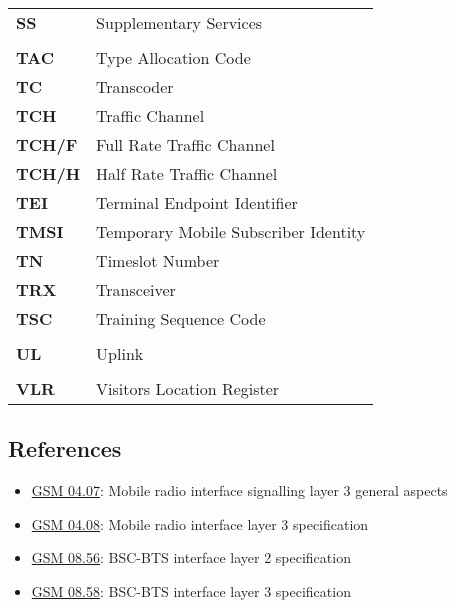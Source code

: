 \documentclass[documentation]{subfiles}
\begin{document}
\begin{longtable}{>{\bf}ll}
    SS      & Supplementary Services\\
    \\
    TAC     & Type Allocation Code\\
    TC      & Transcoder\\
    TCH     & Traffic Channel\\
    TCH/F   & Full Rate Traffic Channel\\
    TCH/H   & Half Rate Traffic Channel\\
    TEI     & Terminal Endpoint Identifier\\
    TMSI    & Temporary Mobile Subscriber Identity\\
    TN      & Timeslot Number\\
    TRX     & Transceiver\\
    TSC     & Training Sequence Code\\
    \\
    UL      & Uplink\\
    \\
    VLR     & Visitors Location Register\\
    \bottomrule
\end{longtable}

\subsection{References}
\begin{itemize}
    \item \href{https://www.etsi.org/deliver/etsi_gts/04/0407/05.01.00_60/gsmts_0407v050100p.pdf}{GSM 04.07}: Mobile radio interface signalling layer 3 general aspects
    \item \href{https://www.etsi.org/deliver/etsi_gts/04/0408/05.00.00_60/gsmts_0408v050000p.pdf}{GSM 04.08}: Mobile radio interface layer 3 specification
    \item \href{https://www.etsi.org/deliver/etsi_gts/08/0856/03.01.01_60/gsmts_0856sv030101p.pdf}{GSM 08.56}: BSC-BTS interface layer 2 specification
    \item \href{https://www.etsi.org/deliver/etsi_gts/08/0858/05.03.00_60/gsmts_0858v050300p.pdf}{GSM 08.58}: BSC-BTS interface layer 3 specification
\end{itemize}
\end{document}
